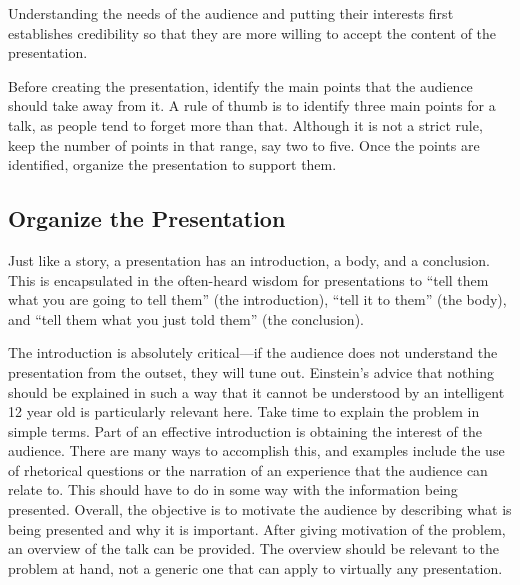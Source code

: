 Understanding the needs of the audience and putting their interests
first establishes credibility so that they are more willing to accept
the content of the presentation.

Before creating the presentation, identify the main points that the
audience should take away from it. A rule of thumb is to identify three
main points for a talk, as people tend to forget more than that.
Although it is not a strict rule, keep the number of points in that
range, say two to five. Once the points are identified, organize the
presentation to support them.

\subsection*{Organize the Presentation}
\label{subsection:organize-the-presentation}

Just like a story, a presentation has an introduction, a body, and a
conclusion. This is encapsulated in the often-heard wisdom for
presentations to ``tell them what you are going to tell them'' (the
introduction), ``tell it to them'' (the body), and ``tell them what you
just told them'' (the conclusion).

The introduction is absolutely critical---if the audience does not
understand the presentation from the outset, they will tune out.
Einstein's advice that nothing should be explained in such a way that it
cannot be understood by an intelligent 12 year old is particularly
relevant here. Take time to explain the problem in simple terms. Part of
an effective introduction is obtaining the interest of the audience.
There are many ways to accomplish this, and examples include the use of
rhetorical questions or the narration of an experience that the audience
can relate to. This should have to do in some way with the information
being presented. Overall, the objective is to motivate the audience by
describing what is being presented and why it is important. After giving
motivation of the problem, an overview of the talk can be provided. The
overview should be relevant to the problem at hand, not a generic one
that can apply to virtually any presentation.


